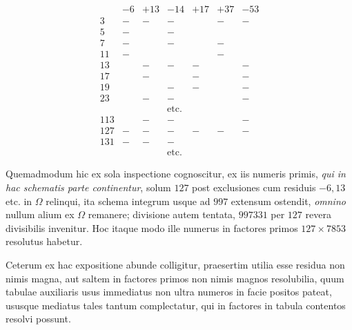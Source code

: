 \[\renewcommand{\arraystretch}{1.05}\begin{array}{|r|c|c|c|c|c|c|}&-6&+13&-14&+17&+37&-53\\\hline 3&-&-&-&&-&-\\5&-&&-&&&\\7&-&&-&&-&\\11&-&&&&-&\\13&&-&-&-&&-\\17&&-&&-&&-\\19&&&-&-&&-\\23&&-&-&&&-\\&&&\text{etc.}&&&\\113&&-&-&&&-\\127&-&-&-&-&-&-\\131&-&-&-&&&\\&&&\text{etc.}&&&\end{array}\]

Quemadmodum hic ex sola inspectione cognoscitur, ex iis numeris primis, \textit{qui in hac schematis parte continentur}, solum \(127\) post exclusiones cum residuis \(-6,\allowbreak 13\) etc. in \(\Omega\) relinqui, ita schema integrum usque ad \(997\) extensum ostendit, \textit{omnino} nullum alium ex \(\Omega\) remanere; divisione autem tentata, \(997331\) per \(127\) revera divisibilis invenitur. Hoc itaque modo ille numerus in factores primos \(127\times7853\) resolutus habetur.

Ceterum ex hac expositione abunde colligitur, praesertim utilia esse residua non nimis magna, aut saltem in factores primos non nimis magnos resolubilia, quum tabulae auxiliaris usus immediatus non ultra numeros in facie positos pateat, ususque mediatus tales tantum complectatur, qui in factores in tabula contentos resolvi possunt.

